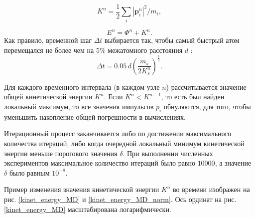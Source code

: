 \begin{equation}
\label{LF4}
K^n = \dfrac{1}{2} \sum_{i} |\mathbf{p}^{n}_i|^2/m_i,
\end{equation}

\begin{equation}
\label{LF5}
E^n = {\Phi}^n + K^n .
\end{equation}
Как правило, временной шаг $\Delta t$ выбирается так, чтобы самый быстрый атом перемещался не более чем на $5\%$
межатомного расстояния $d$ \cite{Eckstein1991}:
\begin{equation}
\label{LF6}
\Delta t = 0.05 \, d \left( \dfrac{m_s}{2 K_s^n} \right)^{\frac{1}{2}}.
\end{equation}

Для каждого временного интервала (в каждом узле $n$) рассчитывается значение общей кинетической энергии $K^n$.
Если $K^n < K^{n-1}$, то есть был найден локальный максимум,
то все значения импульсов $p_{i}$ обнуляются, для того, чтобы уменьшить накопление общей погрешности в вычислениях.

Итерационный процесс заканчивается либо по достижении максимального количества итераций,
либо когда очередной локальный минимум кинетической энергии меньше порогового значения $\delta$.
При выполнении численных экспериментов максимальное количество итераций было равно $10000$,
а значение $\delta$ было равным $10^{-8}$.

Пример изменения значения кинетической энергии $K^n$ во времени изображен на
рис. \ref{kinet_energy_MD} и \ref{kinet_energy_MD_norm}.
Ось ординат на рис. \ref{kinet_energy_MD} масштабирована логарифмически.


